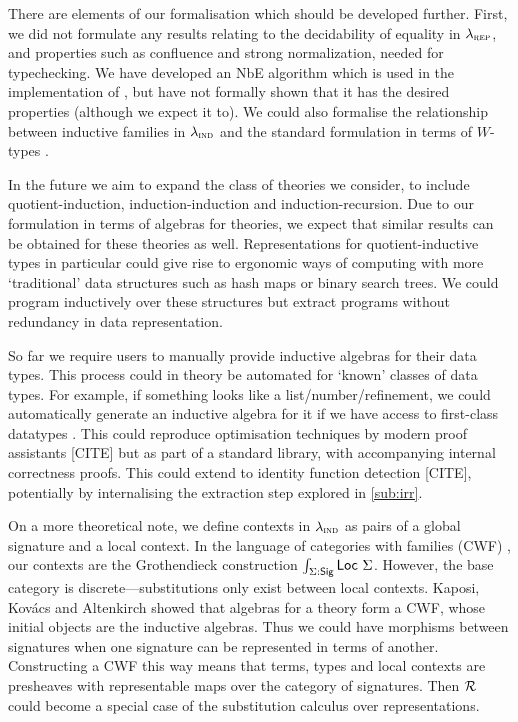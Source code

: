 There are elements of our formalisation which should be developed further. First,
we did not formulate any results relating to the decidability of equality in
$\lambda_{\textsc{rep}}$, and properties such as confluence and strong normalization, needed
for typechecking. We have developed an NbE algorithm which is used in the
implementation of \superfluid, but have not formally shown that it has the
desired properties (although we expect it to). We could also formalise the
relationship between inductive families in $\lambda_{\textsc{ind}}$ and the standard
formulation in terms of $W$-types \cite{Abbott2004-va}.

In the future we aim to expand the class of theories we consider, to include
quotient-induction, induction-induction and induction-recursion. Due to our
formulation in terms of algebras for theories, we expect that similar results
can be obtained for these theories as well. Representations for
quotient-inductive types in particular could give rise to ergonomic ways of
computing with more `traditional' data structures such as hash maps or binary
search trees. We could program inductively over these structures but extract
programs without redundancy in data representation.

So far we require users to manually
provide inductive algebras for their data types. This process could in theory be
automated for `known' classes of data types. For example, if something looks
like a list/number/refinement, we could automatically generate an inductive
algebra for it if we have access to first-class datatypes \cite{Dagand2017-nj}.
This could reproduce optimisation techniques by modern proof assistants [CITE]
but as part of a standard library, with accompanying internal correctness
proofs. This could extend to identity function detection [CITE], potentially by
internalising the extraction step explored in \cref{sub:irr}.

On a more theoretical note, we define contexts in $\lambda_{\textsc{ind}}$ as pairs of a
global signature and a local context. In the language of categories with
families (CWF) \cite{Castellan2019-qo}, our contexts are the Grothendieck
construction $\int _{\Sigma : \textsf{Sig}} \textsf{Loc}\ \Sigma$. However, the base
category is discrete---substitutions only exist between local contexts. Kaposi,
Kov\'acs and Altenkirch \cite{Kaposi2019-pj} showed that algebras for a theory
form a CWF, whose initial objects are the inductive algebras. Thus we could have
morphisms between signatures when one signature can be represented in terms of
another. Constructing a CWF this way means that terms, types and local contexts
are presheaves with representable maps over the category of signatures. Then $\mathcal{R}$
could become a special case of the substitution calculus over representations.

